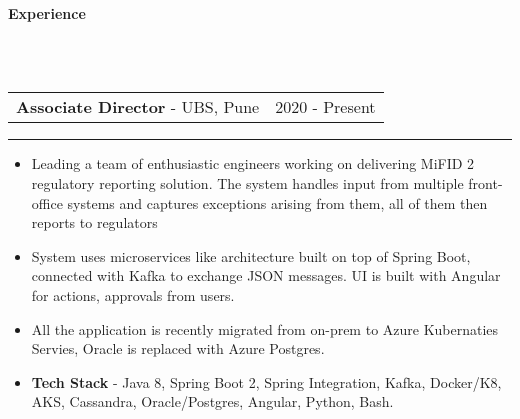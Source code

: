 \documentclass[10pt,A4]{article}
\newcommand{\cvsection}[1]
{
	\begin{center}
		\large\textcolor{sectcol}{\textbf{#1}}
	\end{center}
}
\newcommand{\cvevent}[4]
{

\begin{tabular*}{1\textwidth}{p{13.6cm}  x{3.9cm}}
	\textbf{#2} - \textcolor{bgcol}{#3} &   \vspace{2.0pt}\textcolor{sectcol}{#1}
\end{tabular*}

\vspace{-8pt}
\textcolor{softcol}{\hrule}
\vspace{6pt}

  #4 

}
\begin{document}
\ \\
%
%

\cvsection{Experience}

\ \\ \\

\cvevent{2020 - Present}
{Associate Director}
{UBS, Pune}
{
\begin{itemize}

\item	Leading a team of enthusiastic engineers working on delivering MiFID 2 regulatory reporting solution. 
	The system handles input from multiple front-office systems and captures exceptions arising from them, all of them then reports to regulators
	
\item	System uses microservices like architecture built on top of Spring Boot, connected with Kafka to exchange JSON messages. 
	UI is built with Angular for actions, approvals from users.

	
\item	All the application is recently migrated from on-prem to Azure Kubernaties Servies, Oracle is replaced with Azure Postgres.

		
\item \textbf{Tech Stack} - Java 8, Spring Boot 2, Spring Integration, Kafka, Docker/K8, AKS, Cassandra, Oracle/Postgres, Angular, Python, Bash.

\end{itemize}

}

\ \\ \\
\ \\ \\
\end{document}
